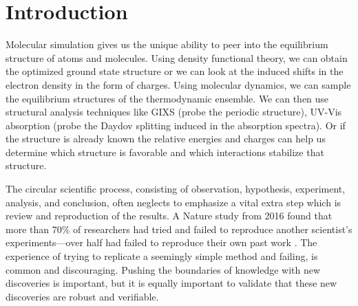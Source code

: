 \chapter{Introduction}

Molecular simulation gives us the unique ability to peer into the equilibrium structure of atoms and molecules.
Using density functional theory, we can obtain the optimized ground state structure or we can look at the induced shifts in the electron density in the form of charges.
Using molecular dynamics, we can sample the equilibrium structures of the thermodynamic ensemble. 
We can then use structural analysis techniques like GIXS (probe the periodic structure), UV-Vis absorption (probe the Daydov splitting induced in the absorption spectra). 
Or if the structure is already known the relative energies and charges can help us determine which structure is favorable and which interactions stabilize that structure.


The circular scientific process, consisting of observation, hypothesis, experiment, analysis, and conclusion, often neglects to emphasize a vital extra step which is review and reproduction of the results. 
A Nature study from 2016 found that more than 70\% of researchers had tried and failed to reproduce another scientist’s experiments---over half had failed to reproduce their own past work \cite{Baker2016}.
The experience of trying to replicate a seemingly simple method and failing, is common and discouraging.
Pushing the boundaries of knowledge with new discoveries is important, but it is equally important to validate that these new discoveries are robust and verifiable.

